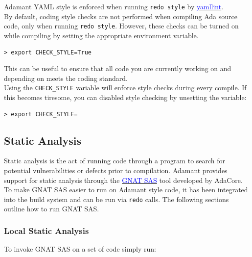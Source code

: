 Adamant YAML style is enforced when running \texttt{redo style} by \href{https://yamllint.readthedocs.io/en/stable/}{\textcolor{blue}{yamllint}}. \\

By default, coding style checks are not performed when compiling Ada source code, only when running \texttt{redo style}. However, these checks can be turned on while compiling by setting the appropriate environment variable.

\vspace{5mm} %
\begin{verbatim}
> export CHECK_STYLE=True
\end{verbatim}
\vspace{5mm} %

This can be useful to ensure that all code you are currently working on and depending on meets the coding standard. \\

Using the \texttt{CHECK\_STYLE} variable will enforce style checks during every compile. If this becomes tiresome, you can disabled style checking by unsetting the variable:

\vspace{5mm} %
\begin{verbatim}
> export CHECK_STYLE=
\end{verbatim}
\vspace{5mm} %

\subsection{Static Analysis} \label{Static Analysis}

Static analysis is the act of running code through a program to search for potential vulnerabilities or defects prior to compilation. Adamant provides support for static analysis through the \href{https://www.adacore.com/static-analysis-suite}{\textcolor{blue}{GNAT SAS}} tool developed by AdaCore. To make GNAT SAS easier to run on Adamant style code, it has been integrated into the build system and can be run via \texttt{redo} calls. The following sections outline how to run GNAT SAS.

\subsubsection{Local Static Analysis}

To invoke GNAT SAS on a set of code simply run:

